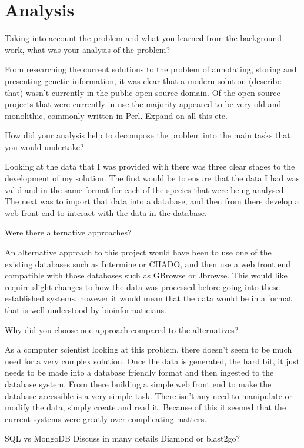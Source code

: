\section{Analysis}
Taking into account the problem and what you learned from the background work, what was your analysis of the problem? 

From researching the current solutions to the problem of annotating, storing and presenting genetic information, it was clear that a modern solution (describe that) wasn't currently in the public open source domain. Of the open source projects that were currently in use the majority appeared to be very old and monolithic, commonly written in Perl. Expand on all this etc.

How did your analysis help to decompose the problem into the main tasks that you would undertake?

Looking at the data that I was provided with there was three clear stages to the development of my solution. The first would be to ensure that the data I had was valid and in the same format for each of the species that were being analysed. The next was to import that data into a database, and then from there develop a web front end to interact with the data in the database. 

Were there alternative approaches? 

An alternative approach to this project would have been to use one of the existing databases such as Intermine or CHADO, and then use a web front end compatible with those databases such as GBrowse or Jbrowse. This would like require slight changes to how the data was processed before going into these established systems, however it would mean that the data would be in a format that is well understood by bioinformaticians. 

Why did you choose one approach compared to the alternatives? 

As a computer scientist looking at this problem, there doesn't seem to be much need for a very complex solution. Once the data is generated, the hard bit, it just needs to be made into a database friendly format and then ingested to the database system. From there building a simple web front end to make the database accessible is a very simple task. There isn't any need to manipulate or modify the data, simply create and read it. Because of this it seemed that the current systems were greatly over complicating matters. 

SQL vs MongoDB Discuss in many details
Diamond or blast2go?

